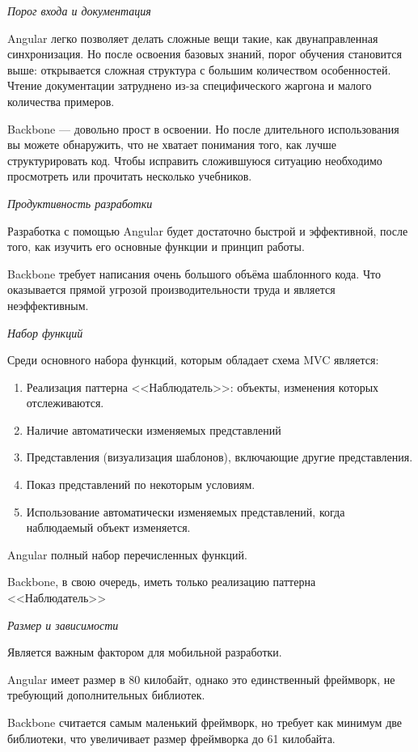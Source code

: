 {\itshape Порог входа и документация}

Angular легко позволяет делать сложные вещи такие, как двунаправленная синхронизация. Но после освоения базовых знаний, порог обучения становится выше: открывается сложная структура с большим количеством особенностей. Чтение документации затруднено из-за специфического жаргона и малого количества примеров.

Backbone — довольно прост в освоении. Но после длительного использования вы можете обнаружить, что не хватает понимания того, как лучше структурировать код. Чтобы исправить сложившуюся ситуацию необходимо просмотреть или прочитать несколько учебников. 

{\itshape Продуктивность разработки}

Разработка с помощью Angular будет достаточно быстрой и эффективной, после того, как изучить его основные функции и принцип работы.

Backbone требует написания очень большого объёма шаблонного кода. Что оказывается прямой угрозой производительности труда и является неэффективным.

{\itshape Набор функций}

Среди основного набора функций, которым обладает схема MVC является:
\begin{enumerate}
\item Реализация паттерна <<Наблюдатель>>: объекты, изменения которых отслеживаются.
\item  Наличие автоматически изменяемых представлений
\item Представления (визуализация шаблонов), включающие другие представления.
\item Показ представлений по некоторым условиям.
\item Использование автоматически изменяемых представлений, когда наблюдаемый объект изменяется.
\end{enumerate}

Angular полный набор перечисленных функций.

Backbone, в свою очередь, иметь только реализацию паттерна <<Наблюдатель>>

{\itshape Размер и зависимости} 

Является важным фактором для мобильной разработки.

Angular имеет размер в 80 килобайт, однако это единственный фреймворк, не требующий дополнительных библиотек.

Backbone считается самым маленький фреймворк, но требует как минимум две библиотеки, что увеличивает размер фреймворка до 61 килобайта.


